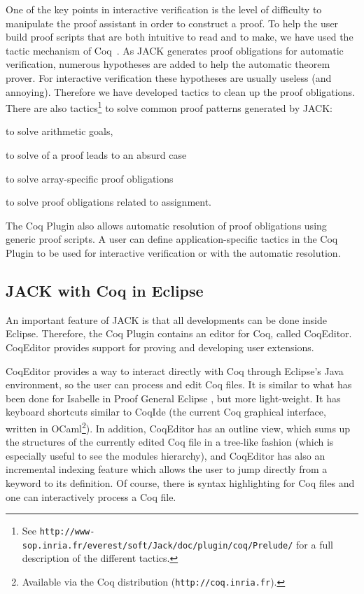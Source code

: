 One of the key points in interactive verification is the level of difficulty
to manipulate the proof assistant in order to construct a proof.
To help the user  build proof scripts that are both intuitive
to read and to make, we have used the tactic mechanism of Coq~\cite{DEL-00-LTAC}.
As JACK generates proof obligations for automatic verification, numerous hypotheses
 are 
added to help the automatic theorem prover. For interactive verification 
these hypotheses are usually useless (and annoying). 
Therefore we have developed tactics to clean up the proof obligations. 
There are also tactics\footnote{
See \texttt{http://www-sop.inria.fr/everest/soft/Jack/doc/plugin/coq/Prelude/}
for a full description of the different tactics.}
 to solve common proof patterns
generated by JACK: \begin{inparaenum}
\item to solve arithmetic goals,
\item to solve of a proof leads to an absurd case
\item to solve array-specific proof obligations 
\item to solve proof obligations related to assignment.
\end{inparaenum}
 The Coq Plugin also allows automatic resolution of proof 
obligations using generic proof scripts.
A user can define application-specific tactics in the Coq Plugin
 to be used for interactive verification or 
with the automatic resolution.



\subsection{JACK with Coq in Eclipse}
An important feature of JACK is that all developments can be done inside Eclipse.
Therefore, the Coq Plugin contains an editor for Coq, called CoqEditor. 
CoqEditor provides support for proving and developing user extensions.

CoqEditor provides a way to interact directly with Coq through Eclipse's Java 
environment, so the user can process and edit Coq files. 
It is similar to what has been done for Isabelle in 
Proof General Eclipse \cite{WintersteinAL05}, but more light-weight.
It has keyboard shortcuts similar to CoqIde (the current Coq graphical
interface, written in OCaml\footnote{Available via the
Coq distribution (\texttt{http://coq.inria.fr}).}). 
In addition, CoqEditor has an outline view,
which sums up the structures of the currently edited Coq file 
in a tree-like fashion (which is especially useful to see the modules hierarchy), 
and
CoqEditor has also an incremental indexing feature which allows the user
to jump directly from a keyword to its definition.
Of course, there is syntax highlighting for Coq files 
and one can interactively process a Coq file.


